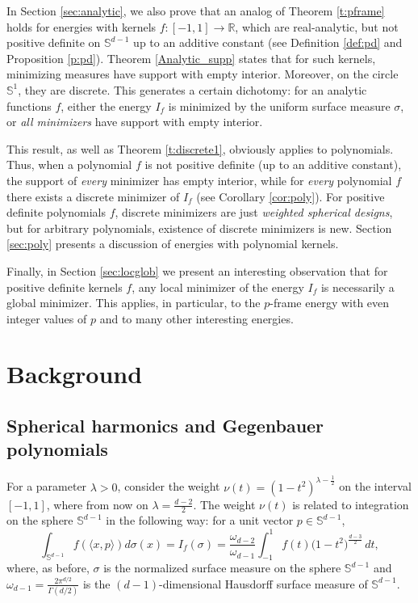 \documentclass[11pt, leqno]{amsart}
\def\R{\mathbb R}
\def\S{\mathbb S}
\theoremstyle{definition}
\numberwithin{equation}{section}
\begin{document}
 In Section \ref{sec:analytic}, we also prove that an analog of Theorem \ref{t:pframe} holds for energies  with kernels  $f:[-1,1]\rightarrow \R$, which are real-analytic, but  not positive definite on $\S^{d-1}$ up to an additive constant (see Definition \ref{def:pd} and Proposition \ref{p:pd}). Theorem \ref{Analytic_supp} states that  for such kernels, minimizing measures have support with empty interior. Moreover, on the circle $\S^1$, they are discrete.  This generates  a certain dichotomy: for an analytic functions $f$, either the energy $I_f$ is minimized by the uniform surface measure $\sigma$, or {\em{all minimizers}} have support with empty interior.
 
 
 This result, as well as Theorem \ref{t:discrete1},   obviously applies to polynomials. Thus, when a polynomial $f$ is not positive definite (up to an additive  constant),  the support of {\em{every}} minimizer has empty interior, while for {\em{every}} polynomial $f$ there exists a discrete minimizer of $I_f$ (see Corollary \ref{cor:poly}). For positive definite polynomials $f$, discrete minimizers are just {\em{weighted spherical designs}}, but for arbitrary polynomials, existence of discrete minimizers is new. Section \ref{sec:poly} presents a discussion of energies with polynomial kernels.
 

 
 Finally, in Section \ref{sec:locglob} we present an interesting observation that for positive definite kernels $f$, any local minimizer of the energy $I_f$ is necessarily a global minimizer. This applies, in particular, to the $p$-frame energy with even integer values of $p$ and to many other interesting energies.  





\section{Background}\label{sec:Background}
\subsection{Spherical harmonics and Gegenbauer polynomials}


For a parameter $\lambda >0$,  consider the weight $\displaystyle{\nu(t) = (1-t^2)^{\lambda -\frac12}}$ on the interval $[-1,1]$, where from now on $\lambda = \frac{d-2}{2}$. The weight $\displaystyle{\nu(t)}$ is related to integration on the sphere $ \S^{d-1}$ in the following way: for a unit vector $p\in \S^{d-1}$,
\begin{equation}
\int_{\S^{d-1}}  f ( \langle x, p \rangle ) d\sigma (x) = I_f ( \sigma) = \frac{\omega_{d-2}}{\omega_{d-1}} \int_{-1}^1 f(t) \big(1-t^2\big)^{\frac{d-3}{2}} \, dt,
\end{equation}
where, as before, $\sigma $ is the normalized surface measure on the sphere $\S^{d-1}$ and $\omega_{d-1} = \frac{2\pi^{d/2}}{\Gamma (d/2)}$ is the $(d-1)$-dimensional Hausdorff surface measure of $\S^{d-1}$. 
\end{document}
